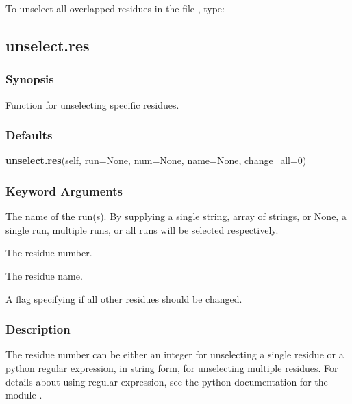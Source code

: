  To unselect all overlapped residues in the file , type: 
  



  

 \newpage 

 \subsection{unselect.res} 

  
 \subsubsection{Synopsis} 

 Function for unselecting specific residues. 
  

  
 \subsubsection{Defaults} 

 \textsf{\textbf{unselect.res}(self, run=None, num=None, name=None, change\_all=0)} 

  
 \subsubsection{Keyword Arguments} 

   The name of the run(s).  By supplying a single string, array of strings, or None, a single run, multiple runs, or all runs will be selected respectively.   

   The residue number.   

   The residue name.   

   A flag specifying if all other residues should be changed.  

  

  
 \subsubsection{Description} 

 The residue number can be either an integer for unselecting a single residue or a python regular expression, in string form, for unselecting multiple residues.  For details about using regular expression, see the python documentation for the module . 
  


